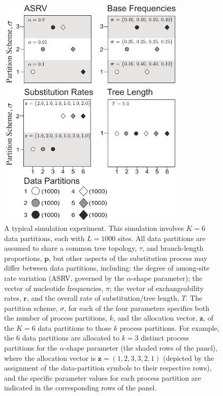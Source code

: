 \documentclass[11pt]{article}
\begin{document}
\begin{figure}[h] 
\centering 
\includegraphics[width=90mm]{figures/figure_0.pdf} 
\caption{A typical simulation experiment.  This simulation involves $K = 6$ data partitions, each with $L = 1000$ sites. All data partitions are assumed to share a common tree topology, $\tau$, and branch-length proportions, ${\mathbf p}$, but other aspects of the substitution process may differ between data partitions, including: the degree of among-site rate variation (ASRV, governed by the $\alpha$-shape parameter); the vector of nucleotide frequencies, \mbox{\boldmath$\pi$\unboldmath}; the vector of exchangeability rates, ${\mathbf r}$, and the overall rate of substitution/tree length, $T$.  The partition scheme, $\sigma$, for each of the four parameters specifies both the number of process partitions, $k$, and the allocation vector, ${\mathbf z}$, of the $K = 6$ data partitions to those $k$ process partitions. For example, the 6 data partitions are allocated to $k = 3$ distinct process partitions for the $\alpha$-shape parameter (the shaded rows of the panel), where the allocation vector is ${\mathbf z}  = (1,2,3,3,2,1)$ (depicted by the assignment of the data-partition symbols to their respective rows), and the specific parameter values for each process partition are indicated in the corresponding rows of the panel.}
\label{sim_design}
\end{figure} 

\newpage
\end{document}
